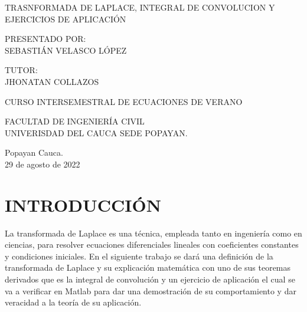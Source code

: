 \documentclass[11pt,letterpaper]{article}
\begin{document}
\begin{center}
TRASNFORMADA DE LAPLACE, INTEGRAL DE CONVOLUCION Y EJERCICIOS DE APLICACIÓN\vspace{3cm}


PRESENTADO POR:\\
SEBASTIÁN VELASCO LÓPEZ\vspace{1.5cm}

TUTOR:\\
JHONATAN COLLAZOS\vspace{2.5cm}

CURSO INTERSEMESTRAL DE ECUACIONES DE VERANO
\vspace{3cm}

FACULTAD DE INGENIERÍA CIVIL\\
UNIVERISDAD DEL CAUCA SEDE POPAYAN.\vspace{2.5cm}
 
Popayan Cauca.\\
29 de agosto de 2022\\

\end{center}
\newpage
\section{INTRODUCCIÓN}
La transformada de Laplace es una técnica, empleada tanto en ingeniería como en ciencias, para resolver ecuaciones diferenciales lineales con coeficientes constantes y condiciones iniciales. En el siguiente trabajo se dará una definición de la transformada de Laplace y su explicación matemática con uno de sus teoremas derivados que es la integral de convolución y un ejercicio de aplicación el
cual se va a verificar en Matlab para dar una demostración de su comportamiento y dar veracidad
a la teoría de su aplicación.\\
\end{document}
